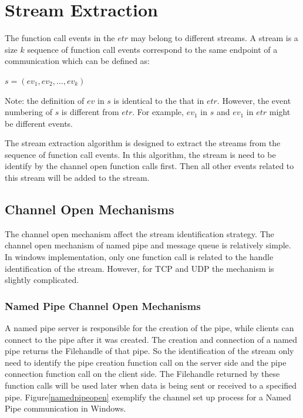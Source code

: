 \section{Stream Extraction}
The function call events in the $etr$ may belong to different streams. A stream is a size $k$ sequence of function call events correspond to the same endpoint of a communication which can be defined as:

$s = (ev_1, ev_2, ..., ev_k)$

Note: the definition of $ev$ in $s$ is identical to the that in $etr$. However, the event numbering of $s$ is different from $etr$. For example, $ev_1$ in $s$ and $ev_1$ in $etr$ might be different events.

The stream extraction algorithm is designed to extract the streams from the sequence of function call events. In this algorithm, the stream is need to be identify by the channel open function calls first. Then all other events related to this stream will be added to the stream.

\subsection{Channel Open Mechanisms}
The channel open mechanism affect the stream identification strategy. The channel open mechanism of named pipe and message queue is relatively simple. In windows implementation, only one function call is related to the handle identification of the stream. However, for TCP and UDP the mechanism is slightly complicated.

\subsubsection{Named Pipe Channel Open Mechanisms} 
A named pipe server is responsible for the creation of the pipe, while clients can connect to the pipe after it was created. The creation and connection of a named pipe returns the Filehandle of that pipe. So the identification of the stream only need to identify the pipe creation function call on the server side and the pipe connection function call on the client side. The Filehandle returned by these function calls will be used later when data is being sent or received to a specified pipe. Figure\ref{namedpipeopen} exemplify the channel set up process for a Named Pipe communication in Windows. 

